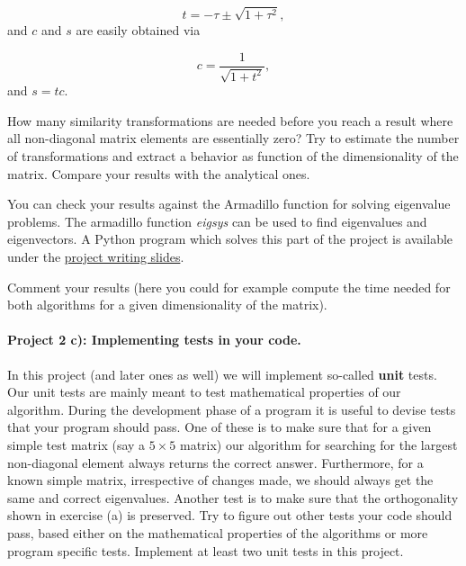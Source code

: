 \documentclass[%
oneside,                 %
final,                   %
10pt]{article}
\begin{document}
\begin{equation*}
  t = -\tau \pm \sqrt{1+\tau^2},
\end{equation*}
and $c$ and $s$ are easily obtained via

\begin{equation*}
   c = \frac{1}{\sqrt{1+t^2}},
\end{equation*}
and $s=tc$.  


How many similarity transformations are needed before you reach a 
result where all non-diagonal matrix elements are essentially zero?
Try to estimate the number of transformations and extract a behavior as function
of the dimensionality of the matrix. Compare your results with the analytical ones.

You can check your results against the Armadillo function for solving 
eigenvalue problems. The armadillo function \emph{eigsys} can be used to find eigenvalues and eigenvectors.
A Python program which solves this part of the project is available under the \href{{http://compphysics.github.io/ComputationalPhysics/doc/pub/projectwriting/html/projectwriting.html}}{project writing slides}. 



Comment your results (here you could for example compute the time needed for 
both algorithms for a given dimensionality of the matrix).  


\paragraph{Project 2 c): Implementing tests in your code.}
In this project (and later ones as well) we will implement so-called \textbf{unit} tests. Our unit tests are mainly meant to test mathematical properties of our algorithm. During the development phase of a program it is useful to devise tests that your program should pass. One of these is to make sure that for a given simple test matrix (say a $5\times 5$ matrix) our algorithm for searching for the largest non-diagonal element always returns the correct answer. Furthermore, for a known simple matrix, irrespective of changes made, we should always get the same and correct eigenvalues. Another test is to make sure that the orthogonality shown in exercise (a) is preserved. Try to figure out other tests your code should pass, based either on the mathematical properties of the algorithms or more program specific tests. Implement at least two unit tests in this project. 
\end{document}

